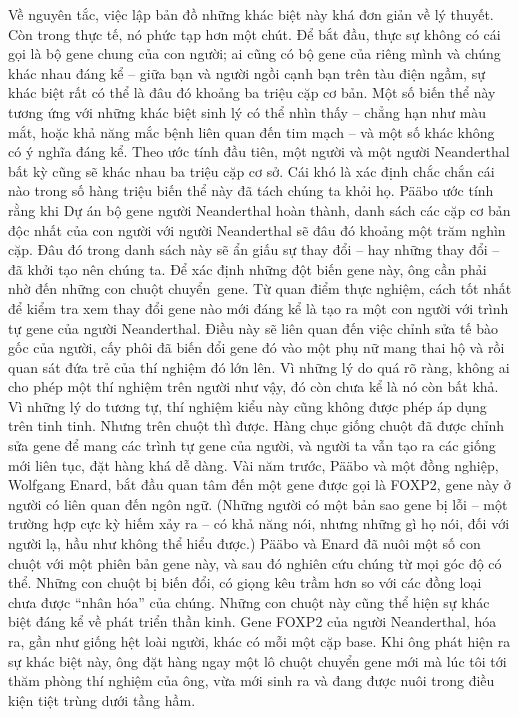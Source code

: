 \begin{multicols}{2}
	Về nguyên tắc, việc lập bản đồ những khác biệt này khá đơn giản về lý thuyết. Còn trong thực tế, nó phức tạp hơn một chút. Để bắt đầu, thực sự không có cái gọi là bộ gene chung của con người; ai cũng có bộ gene của riêng mình và chúng khác nhau đáng kể -- giữa bạn và người ngồi cạnh bạn trên tàu điện ngầm, sự khác biệt rất có thể là đâu đó khoảng ba triệu cặp cơ bản. Một số biến thể này tương ứng với những khác biệt sinh lý có thể nhìn thấy -- chẳng hạn như màu mắt, hoặc khả năng mắc bệnh liên quan đến tim mạch -- và một số khác không có ý nghĩa đáng kể. Theo ước tính đầu tiên, một người và một người Neanderthal bất kỳ cũng sẽ khác nhau ba triệu cặp cơ sở. Cái khó là xác định chắc chắn cái nào trong số hàng triệu biến thể này đã tách chúng ta khỏi họ. Pääbo ước tính rằng khi Dự án bộ gene người Neanderthal hoàn thành, danh sách các cặp cơ bản độc nhất của con người với người Neanderthal sẽ đâu đó khoảng một trăm nghìn cặp. Đâu đó trong danh sách này sẽ ẩn giấu sự thay đổi -- hay những thay đổi -- đã khởi tạo nên chúng ta. Để xác định những đột biến gene này, ông cần phải nhờ đến những con chuột chuyển~gene.
	\vskip 0.1cm
	Từ quan điểm thực nghiệm, cách tốt nhất để kiểm tra xem thay đổi gene nào mới đáng kể là tạo ra một con người với trình tự gene của người Neanderthal. Điều này sẽ liên quan đến việc chỉnh sửa tế bào gốc của người, cấy phôi đã biến đổi gene đó vào một phụ nữ mang thai hộ và rồi quan sát đứa trẻ của thí nghiệm đó lớn lên. Vì những lý do quá rõ ràng, không ai cho phép một thí nghiệm trên người như vậy, đó còn chưa kể là nó còn bất khả. Vì những lý do tương tự, thí nghiệm kiểu này cũng không được phép áp dụng trên tinh tinh. Nhưng trên chuột thì được. Hàng chục giống chuột đã được chỉnh sửa gene để mang các trình tự gene của người, và người ta vẫn tạo ra các giống mới liên tục, đặt hàng khá dễ dàng.
	\vskip 0.1cm
	Vài năm trước, Pääbo và một đồng nghiệp, Wolfgang Enard, bắt đầu quan tâm đến một gene được gọi là FOXP$2$, gene này ở người có liên quan đến ngôn ngữ. (Những người có một bản sao gene bị lỗi -- một trường hợp cực kỳ hiếm xảy ra -- có khả năng nói, nhưng những gì họ nói, đối với người lạ, hầu như không thể hiểu được.) Pääbo và Enard đã nuôi một số con chuột với một phiên bản gene này, và sau đó nghiên cứu chúng từ mọi góc độ có thể. Những con chuột bị biến đổi, có giọng kêu trầm hơn so với các đồng loại chưa được “nhân hóa” của chúng. Những con chuột này cũng thể hiện sự khác biệt đáng kể về phát triển thần kinh. Gene FOXP$2$ của người Neanderthal, hóa ra, gần như giống hệt loài người, khác có mỗi một cặp base. Khi ông phát hiện ra sự khác biệt này, ông đặt hàng ngay một lô chuột chuyển gene mới mà lúc tôi tới thăm phòng thí nghiệm của ông, vừa mới sinh ra và đang được nuôi trong điều kiện tiệt trùng dưới tầng hầm.

\end{multicols}
